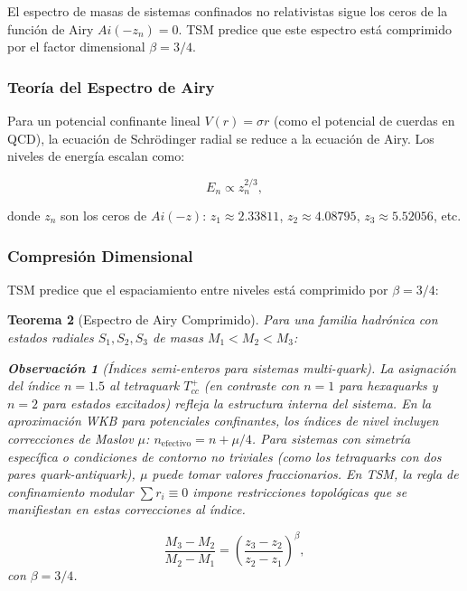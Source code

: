 \documentclass[11pt, a4paper]{article}
\theoremstyle{plain}
\newtheorem{teorema}{Teorema}[section]
\theoremstyle{definition}
\newtheorem{observacion}[teorema]{Observación}
\begin{document}
El espectro de masas de sistemas confinados no relativistas sigue los ceros de la función de Airy $Ai(-z_n)=0$. TSM predice que este espectro está comprimido por el factor dimensional $\beta = 3/4$.

\subsubsection{Teoría del Espectro de Airy}

Para un potencial confinante lineal $V(r) = \sigma r$ (como el potencial de cuerdas en QCD), la ecuación de Schrödinger radial se reduce a la ecuación de Airy. Los niveles de energía escalan como:

\begin{equation}
E_n \propto z_n^{2/3},
\end{equation}

donde $z_n$ son los ceros de $Ai(-z)$: $z_1 \approx 2.33811$, $z_2 \approx 4.08795$, $z_3 \approx 5.52056$, etc.

\subsubsection{Compresión Dimensional}

TSM predice que el espaciamiento entre niveles está comprimido por $\beta = 3/4$:


\begin{teorema}[Espectro de Airy Comprimido]

Para una familia hadrónica con estados radiales $S_1, S_2, S_3$ de masas $M_1 < M_2 < M_3$:
\begin{observacion}[Índices semi-enteros para sistemas multi-quark]
La asignación del índice $n=1.5$ al tetraquark $T_{cc}^+$ (en contraste con $n=1$ para hexaquarks y $n=2$ para estados excitados) refleja la estructura interna del sistema. En la aproximación WKB para potenciales confinantes, los índices de nivel incluyen correcciones de Maslov $\mu$: $n_{\text{efectivo}} = n + \mu/4$. Para sistemas con simetría específica o condiciones de contorno no triviales (como los tetraquarks con dos pares quark-antiquark), $\mu$ puede tomar valores fraccionarios. En TSM, la regla de confinamiento modular $\sum r_i \equiv 0$ impone restricciones topológicas que se manifiestan en estas correcciones al índice.
\end{observacion}
\begin{equation}
\frac{M_3 - M_2}{M_2 - M_1} = \left(\frac{z_3 - z_2}{z_2 - z_1}\right)^\beta,
\label{eq:airy_compressed}
\end{equation}
con $\beta = 3/4$.
\end{teorema}
\end{document}
